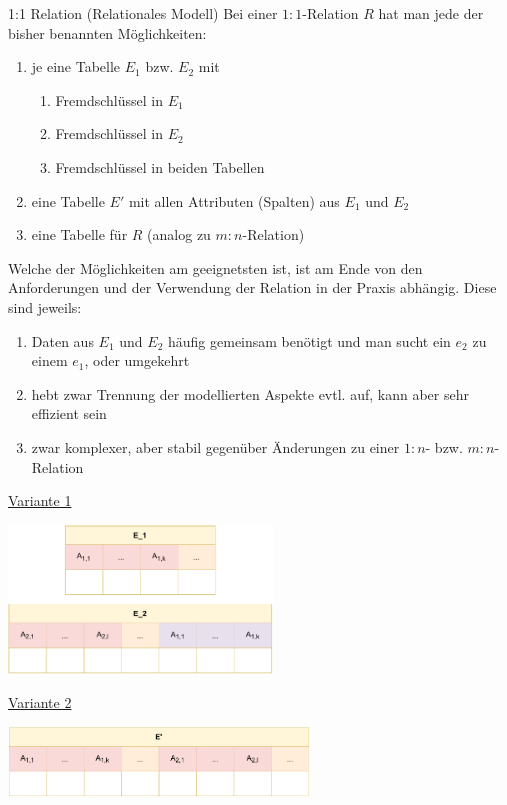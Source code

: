 \begin{defi}{1:1 Relation (Relationales Modell)}
    Bei einer $1:1$-Relation $R$ hat man jede der bisher benannten Möglichkeiten:
    \begin{enumerate}
        \item je eine Tabelle $E_1$ bzw. $E_2$ mit
              \begin{enumerate}
                  \item Fremdschlüssel in $E_1$
                  \item Fremdschlüssel in $E_2$
                  \item Fremdschlüssel in beiden Tabellen
              \end{enumerate}
        \item eine Tabelle $E'$ mit allen Attributen (Spalten) aus $E_1$ und $E_2$
        \item eine Tabelle für $R$ (analog zu $m:n$-Relation)
    \end{enumerate}

    Welche der Möglichkeiten am geeignetsten ist, ist am Ende von den Anforderungen und der Verwendung der Relation in der Praxis abhängig.
    Diese sind jeweils:

    \begin{enumerate}
        \item Daten aus $E_1$ und $E_2$ häufig gemeinsam benötigt und man sucht ein $e_2$ zu einem $e_1$, oder umgekehrt
        \item hebt zwar Trennung der modellierten Aspekte evtl. auf, kann aber sehr effizient sein
        \item zwar komplexer, aber stabil gegenüber Änderungen zu einer $1:n$- bzw. $m:n$-Relation
    \end{enumerate}

    \underline{Variante 1}
    \begin{center}
        \includegraphics[width=0.525\textwidth]{includes/figures/definition_relational_modell_relation_one_to_one_1.pdf}
    \end{center}

    \underline{Variante 2}
    \begin{center}
        \includegraphics[width=0.6\textwidth]{includes/figures/definition_relational_modell_relation_one_to_one_2.pdf}
    \end{center}


\end{defi}
